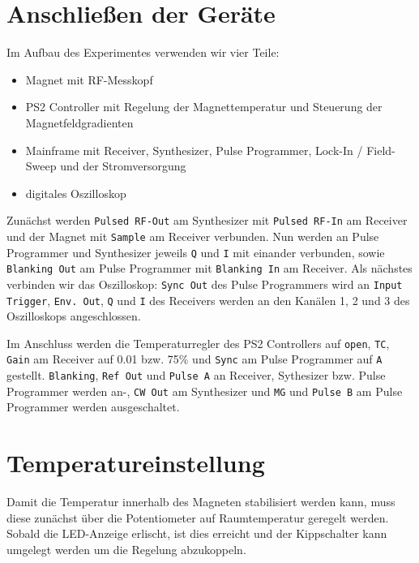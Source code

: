 \section{Anschließen der Geräte}

Im Aufbau des Experimentes verwenden wir vier Teile:

\begin{itemize}
    \item
        Magnet mit RF-Messkopf
    \item
        PS2 Controller mit Regelung der Magnettemperatur und Steuerung der
        Magnetfeldgradienten
    \item
        Mainframe mit Receiver, Synthesizer, Pulse Programmer, Lock-In /
        Field-Sweep und der Stromversorgung
    \item
        digitales Oszilloskop
\end{itemize}

Zunächst werden \texttt{Pulsed RF-Out} am Synthesizer mit \texttt{Pulsed
RF-In} am Receiver und der Magnet mit \texttt{Sample} am Receiver verbunden.
Nun werden an Pulse Programmer und Synthesizer jeweils \texttt{Q} und
\texttt{I} mit einander verbunden, sowie \texttt{Blanking Out} am Pulse
Programmer mit \texttt{Blanking In} am Receiver. Als nächstes verbinden wir
das Oszilloskop: \texttt{Sync Out} des Pulse Programmers wird an
\texttt{Input Trigger}, \texttt{Env. Out}, \texttt{Q} und \texttt{I} des
Receivers werden an den Kanälen 1, 2 und 3 des Oszilloskops angeschlossen.

Im Anschluss werden die Temperaturregler des PS2 Controllers auf
\texttt{open}, \texttt{TC}, \texttt{Gain} am Receiver
auf \num{0.01} bzw. 75\% und \texttt{Sync} am Pulse Programmer
auf \texttt{A} gestellt.
\texttt{Blanking}, \texttt{Ref Out} und \texttt{Pulse A} an
Receiver, Sythesizer bzw. Pulse Programmer werden an-, \texttt{CW Out} am
Synthesizer und \texttt{MG} und \texttt{Pulse B} am Pulse Programmer werden
ausgeschaltet. 

\section{Temperatureinstellung}

Damit die Temperatur innerhalb des Magneten stabilisiert werden kann, muss
diese zunächst über die Potentiometer auf Raumtemperatur geregelt werden.
Sobald die LED-Anzeige erlischt, ist dies erreicht und der Kippschalter kann
umgelegt werden um die Regelung abzukoppeln.


